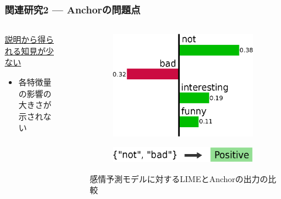 \documentclass[aspectratio=169]{slide-ja}
\begin{document}
\begin{frame}
  \frametitle{関連研究2 — Anchorの問題点}
  \begin{columns}[]
    \begin{column}{0.4\textwidth}
      \underline{説明から得られる知見が少ない}

      \bigskip
      \begin{itemize}
        \item 各特徴量の影響の大きさが \\ 示されない
      \end{itemize}
    \end{column}
    \begin{column}{0.5\textwidth}
      \begin{figure}
        \begin{subfigure}[t]{\textwidth}
          \centering
          \includegraphics[scale=0.4]{example-lime}
        \end{subfigure}
        \begin{subfigure}[t]{\textwidth}
          \centering
          \vspace{0.5em}
          \includegraphics[scale=0.4]{example-anchor}
        \end{subfigure}
        \vspace{0.5em}
        \caption{感情予測モデルに対するLIMEとAnchorの出力の比較}
      \end{figure}
    \end{column}
  \end{columns}
\end{frame}
\end{document}
